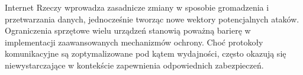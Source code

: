 \vspace{10pt}
Internet Rzeczy wprowadza zasadnicze zmiany w sposobie gromadzenia i przetwarzania danych, jednocześnie tworząc nowe wektory potencjalnych ataków. Ograniczenia sprzętowe wielu urządzeń stanowią poważną barierę w implementacji zaawansowanych mechanizmów ochrony. Choć protokoły komunikacyjne są zoptymalizowane pod kątem wydajności, często okazują się niewystarczające w kontekście zapewnienia odpowiednich zabezpieczeń.